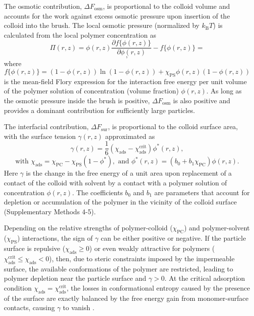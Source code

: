 \documentclass[12pt, a4paper]{article}
\begin{document}
The osmotic contribution, $\Delta F_{\text{osm}}$, is proportional to the colloid volume and accounts for the work against excess osmotic pressure upon insertion of the colloid into the brush.
The local osmotic pressure (normalized by $k_\text{B} T$) is calculated from the local polymer concentration as
$$
\Pi(r,z)=  \phi(r,z)\frac{\partial f\{\phi(r,z)\}}{\partial \phi(r,z)} - f\{\phi(r,z)\}= 
$$
\begin{equation}
	[-\ln(1-\phi(r,z)) - \phi(r,z) -\chi_{\text{PS}}\phi^2(r,z)],
\end{equation}
where 
$$
f\{\phi(r,z)\}=(1-\phi(r,z))\ln(1-\phi(r,z)) +\chi_{\text{PS}}\phi(r,z)(1-\phi(r,z))
$$
is the mean-field Flory expression for the interaction free energy per unit volume of the polymer solution of concentration (volume fraction) $\phi(r,z)$.
As long as the osmotic pressure inside the brush is positive, $\Delta F_{\text{osm}}$ is also positive and provides a dominant contribution for sufficiently large particles.

The interfacial contribution, $\Delta F_{\text{sur}}$, is proportional to the colloid surface area, with the surface tension $\gamma (r,z)$ approximated as
\begin{equation}
    \gamma (r,z)= \frac{1}{6}(\chi_{\text{ads}} - \chi_{\text{ads}}^{\text{crit}})\phi^{\ast}(r,z),
    \label{eq:chi_ads} 
\end{equation}
$$
\text{with } \chi_{\text{ads}} = \chi_{\text{PC}} - \chi_{\text{PS}}(1-\phi^{\ast}), \text{ and } \phi^{\ast}(r,z)= (b_{0} + b_{1}\chi_{\text{PC}})\phi(r,z).
$$
Here $\gamma$ is the change in the free energy of a unit area upon replacement of a contact of the colloid with solvent by a contact with a polymer solution of concentration $\phi(r,z)$.
The coefficients $b_0$ and $b_1$ are parameters that account for depletion or accumulation of the polymer in the vicinity of the colloid surface (Supplementary Methods 4-5).

Depending on the relative strengths of polymer-colloid ($\chi_{\text{PC}}$) and polymer-solvent ($\chi_{\text{PS}}$) interactions, the sign of $\gamma$ can be either positive or negative.
If the particle surface is repulsive ($\chi_{\text{ads}} \geq 0$) or even weakly attractive for polymers ($\chi_{\text{ads}}^{\text{crit}} \leq \chi_{\text{ads}} < 0$), then, due to steric constraints imposed by the impermeable surface, the available conformations of the polymer are restricted, leading to polymer depletion near the particle surface and $\gamma > 0$.
At the critical adsorption condition $\chi_{\text{ads}} = \chi_{\text{ads}}^{\text{crit}}$, the losses in conformational entropy caused by the presence of the surface are exactly balanced by the free energy gain from monomer-surface contacts, causing $\gamma$ to vanish \cite{Fleer1993,Birshtein1979,Birshtein1983,Eisenriegler1982}.
\end{document}
